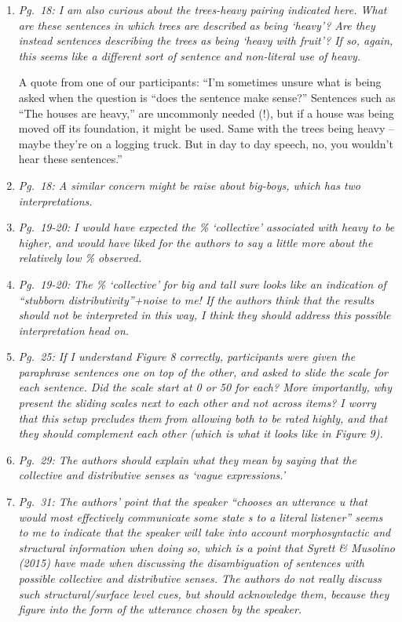 \documentclass[12pt]{article}
\begin{document}
\begin{enumerate}
\item \emph{Pg.~18: I am also curious about the \emph{trees-heavy} pairing indicated here. What are these sentences in which trees are described as being `heavy'? Are they instead sentences describing the trees as being `heavy with fruit'? If so, again, this seems like a different sort of sentence and non-literal use of heavy.}

A quote from one of our participants: ``I'm sometimes unsure what is being asked when the question is ``does the sentence make sense?''  Sentences such as ``The houses are heavy,'' are uncommonly needed (!), but if a house was being moved off its foundation, it might be used.  Same with the trees being heavy -- maybe they're on a logging truck.  But in day to day speech, no, you wouldn't hear these sentences.''

\item \emph{Pg.~18: A similar concern might be raise about \emph{big-boys}, which has two interpretations.}

\item \emph{Pg.~19-20: I would have expected the \% `collective' associated with \emph{heavy} to be higher, and would have liked for the authors to say a little more about the relatively low \% observed.}
	
\item \emph{Pg.~19-20: The \% `collective' for \emph{big} and \emph{tall} sure looks like an indication of “stubborn distributivity”+noise to me! If the authors think that the results should not be interpreted in this way, I think they should address this possible interpretation head on.}

\item \emph{Pg.~25: If I understand Figure 8 correctly, participants were given the paraphrase sentences one on top of the other, and asked to slide the scale for each sentence. Did the scale start at 0 or 50 for each? More importantly, why present the sliding scales next to each other and not across items? I worry that this setup precludes them from allowing both to be rated highly, and that they should complement each other (which is what it looks like in Figure 9).}

\item \emph{Pg.~29: The authors should explain what they mean by saying that the collective and distributive senses as `vague expressions.'}

\item \emph{Pg.~31: The authors' point that the speaker ``chooses an utterance u that would most effectively communicate some state s to a literal listener'' seems to me to indicate that the speaker will take
into account morphosyntactic and structural information when doing so, which is a point that Syrett \& Musolino (2015) have made when discussing the disambiguation of sentences with possible collective and distributive senses. The authors do not really discuss such structural/surface level cues, but should acknowledge them, because they figure into the form of the utterance chosen by the speaker.}


\end{enumerate}
\end{document}
